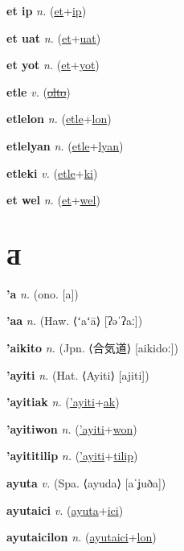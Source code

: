 \textbf{\hypertarget{et ip}{et ip}} \textit{n.} (\hyperlink{et}{et}+\allowbreak \hyperlink{ip}{ip})


\textbf{\hypertarget{et uat}{et uat}} \textit{n.} (\hyperlink{et}{et}+\allowbreak \hyperlink{uat}{uat})


\textbf{\hypertarget{et yot}{et yot}} \textit{n.} (\hyperlink{et}{et}+\allowbreak \hyperlink{yot}{yot})


\textbf{\hypertarget{etle}{etle}} \textit{v.} (\hyperlink{olto}{\sout{olto}})


\textbf{\hypertarget{etlelon}{etlelon}} \textit{n.} (\hyperlink{etle}{etle}+\allowbreak \hyperlink{lon}{lon})


\textbf{\hypertarget{etlelyan}{etlelyan}} \textit{n.} (\hyperlink{etle}{etle}+\allowbreak \hyperlink{lyan}{lyan})


\textbf{\hypertarget{etleki}{etleki}} \textit{v.} (\hyperlink{etle}{etle}+\allowbreak \hyperlink{ki}{ki})


\textbf{\hypertarget{et wel}{et wel}} \textit{n.} (\hyperlink{et}{et}+\allowbreak \hyperlink{wel}{wel})


\section{Ƌ}

\textbf{\hypertarget{'a}{'a}} \textit{n.} (ono. [a])


\textbf{\hypertarget{'aa}{'aa}} \textit{n.} (Haw. ⟨ʻaʻā⟩ [ʔəˈʔaː])


\textbf{\hypertarget{'aikito}{'aikito}} \textit{n.} (Jpn. ⟨{\japanese{}合気道}⟩ [aikidoː])


\textbf{\hypertarget{'ayiti}{'ayiti}} \textit{n.} (Hat. ⟨Ayiti⟩ [ajiti])


\textbf{\hypertarget{'ayitiak}{'ayitiak}} \textit{n.} (\hyperlink{'ayiti}{'ayiti}+\allowbreak \hyperlink{ak}{ak})


\textbf{\hypertarget{'ayitiwon}{'ayitiwon}} \textit{n.} (\hyperlink{'ayiti}{'ayiti}+\allowbreak \hyperlink{won}{won})


\textbf{\hypertarget{'ayititilip}{'ayititilip}} \textit{n.} (\hyperlink{'ayiti}{'ayiti}+\allowbreak \hyperlink{tilip}{tilip})


\textbf{\hypertarget{ayuta}{ayuta}} \textit{v.} (Spa. ⟨ayuda⟩ [aˈʝuða])


\textbf{\hypertarget{ayutaici}{ayutaici}} \textit{v.} (\hyperlink{ayuta}{ayuta}+\allowbreak \hyperlink{ici}{ici})


\textbf{\hypertarget{ayutaicilon}{ayutaicilon}} \textit{n.} (\hyperlink{ayutaici}{ayutaici}+\allowbreak \hyperlink{lon}{lon})


